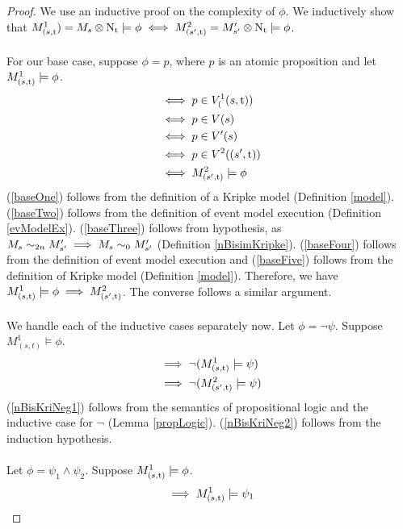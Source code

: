 \begin{proof}
We use an inductive proof on the complexity of $\phi$.
We inductively show that $M^1_{(s, \mathrm{t} }) = M_s \otimes  \mathrm{N_t}  \models \phi \iff
M^2_{(s', \mathrm{t} )} = M'_{s'}
\otimes  \mathrm{N_t}  \models \phi$.\\
\\
For our base case, suppose $\phi = p$, where $p$ is an atomic proposition and let
$M^1_{(s, \mathrm{t} )} \models \phi$.
\begin{align}
  & \iff p \in V^1_((s, \mathrm{t} )) \label{baseOne} \\
  & \iff p \in V(s) \label{baseTwo} \\
  & \iff p \in V'(s) \label{baseThree} \\
  & \iff p \in V^2((s', \mathrm{t} )) \label{baseFour} \\
  & \iff M^2_{(s', \mathrm{t} )} \models \phi \label{baseFive}
\end{align}
(\ref{baseOne}) follows from the definition of a Kripke model (Definition
\ref{model}).
(\ref{baseTwo}) follows from the definition of event model execution
(Definition \ref{evModelEx}).
(\ref{baseThree}) follows from hypothesis, as $M_s \sim_{2n} M'_{s'} \implies M_s \sim_0
M'_{s'}$
(Definition \ref{nBisimKripke}).
(\ref{baseFour}) follows from the definition of event model execution and
(\ref{baseFive}) follows from the definition of Kripke model (Definition
\ref{model}).
Therefore, we have $M^1_{(s, \mathrm{t} )} \models \phi \implies M^2_{(s', \mathrm{t} )}$.
The converse follows a similar argument.\\
\\
We handle each of the inductive cases separately now.
Let $\phi = \neg \psi$.
Suppose $M^1_{(s,t)} \models \phi$.
\begin{align}
	& \implies \neg (M^1_{(s, \mathrm{t} )} \models \psi) \label{nBisKriNeg1} \\
	& \implies \neg (M^2_{(s', \mathrm{t} )} \models \psi) \label{nBisKriNeg2}
\end{align}
(\ref{nBisKriNeg1}) follows from the semantics of propositional logic and the inductive case for
$\neg$ (Lemma \ref{propLogic}).
(\ref{nBisKriNeg2}) follows from the induction hypothesis.\\
\\
Let $\phi = \psi_1 \land \psi_2$.
Suppose $M^1_{(s, \mathrm{t} )} \models \phi$.
\begin{align}
	& \implies \krMo^1_{(s,\aMod{t})} \models \psi_1 \label{nBisKriConj1} \\

\end{align}
\end{proof}
